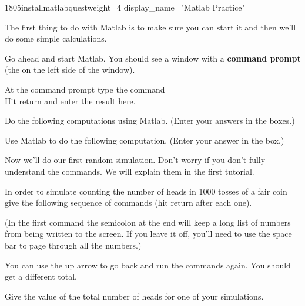 \begin{edXproblem}{1805installmatlabquest}{weight=4 display_name="Matlab Practice"}

The first thing to do with Matlab is to make sure you can start it and then
we'll do some simple calculations. 

Go ahead and start Matlab. You should see a window with a 
\textbf{command prompt} (the \mlprompt{} on the left side of the window). 

 At the command prompt type the command\\
Hit return and enter the result here.\\

 Do the following computations using Matlab. 
(Enter your answers in the boxes.)\\



 Use Matlab to do the following computation.
(Enter your answer in the box.)\\

 Now we'll do our first random simulation. Don't worry if you
don't fully understand the commands. We will explain them in 
the first tutorial. 

In order to simulate counting the number of heads in 1000 tosses of  a fair coin give the following sequence of commands (hit return after each one).

(In the first command the semicolon at the end 
will keep a long list of numbers from being
written to the screen. If you leave it off, you'll need to use the space bar to
page through all the numbers.)\\

You can use the up arrow to go back and run the commands again. You should get
a different total.

Give the value of the total number of heads for one of your simulations.

\end{edXproblem}






